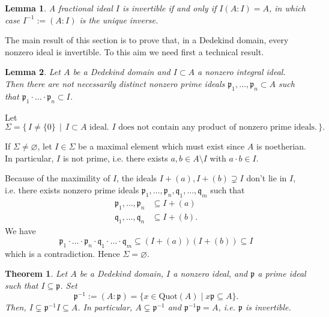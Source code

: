 \documentclass[a4paper]{book}
\theoremstyle{break}
\theoremstyle{plain}
\newtheorem{theorem}{Theorem}[definition]
\newtheorem{lemma}{Lemma}[definition]
\begin{document}
\begin{lemma}
    A fractional ideal \(I\) is invertible if and only if \(I (A : I) = A\), in which case \(I^{-1} := (A : I)\) is the unique inverse.
\end{lemma}


The main result of this section is to prove that, in a Dedekind domain, every nonzero ideal is invertible. To this aim we need first a technical result.

\begin{lemma}
    Let \(A\) be a {\color{mathif}Dedekind domain} and \(I \subset A\) a {\color{mathif}nonzero integral ideal}. Then there are not necessarily distinct {\color{maththen}nonzero prime ideals} \(\mathfrak{p}_1, \dots, \mathfrak{p}_n \subset A\) such that \(\mathfrak{p}_1 \cdot \dots \cdot \mathfrak{p}_n \subset I\).
\end{lemma}


Let
\begin{equation}
    \Sigma = \{\, I \neq \{0\} \, \mid \, I \subset A \text{ ideal. \(I\) does not contain any product of nonzero prime ideals.} \, \} \text{.}
\end{equation}

If \(\Sigma \neq \varnothing\), let \(I \in \Sigma\) be a maximal element which must exist since \(A\) is noetherian. In particular, \(I\) is not prime, i.e. there exists \(a, b \in A \setminus I\) with \(a \cdot b \in I\). %

Because of the maximility of \(I\), the ideals \(I + (a), I + (b) \supsetneq I\) don't lie in \(I\), i.e. there exists nonzero prime ideals \(\mathfrak{p}_1, \dots, \mathfrak{p}_n, \mathfrak{q}_1, \dots, \mathfrak{q}_m\) such that
\begin{align}
    \mathfrak{p}_1, \dots, \mathfrak{p}_n &\subseteq I + (a) \\
    \mathfrak{q}_1, \dots, \mathfrak{q}_n &\subseteq I + (b) \text{.}
\end{align}
We have
\begin{equation}
    \mathfrak{p}_1 \cdot \dots \cdot \mathfrak{p}_n \cdot \mathfrak{q}_1 \cdot \dots \cdot \mathfrak{q}_m \subseteq (I + (a))(I + (b)) \subseteq I
\end{equation}
which is a contradiction. Hence \(\Sigma = \varnothing\).

\begin{theorem}
    Let \(A\) be a Dedekind domain, \(I\) a nonzero ideal, and \(\mathfrak{p}\) a prime ideal such that \(I \subseteq \mathfrak{p}\). Set
    \begin{equation}
        \mathfrak{p}^{-1} := (A : \mathfrak{p}) = \{x \in \text{Quot}(A) \mid x \mathfrak{p} \subseteq A\} \text{.}
    \end{equation}
    Then, \(I \subsetneq \mathfrak{p}^{-1} I \subseteq A\). In particular, \(A \subsetneq \mathfrak{p}^{-1}\) and \(\mathfrak{p}^{-1}\mathfrak{p} = A\), i.e. \(\mathfrak{p}\) is invertible.
\end{theorem}
\end{document}
